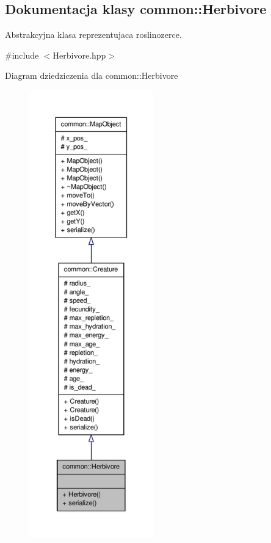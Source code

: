 \hypertarget{classcommon_1_1Herbivore}{\subsection{Dokumentacja klasy common\-:\-:Herbivore}
\label{classcommon_1_1Herbivore}
}


Abstrakcyjna klasa reprezentujaca roslinozerce.  




{\ttfamily \#include $<$Herbivore.\-hpp$>$}



Diagram dziedziczenia dla common\-:\-:Herbivore
\nopagebreak
\begin{figure}[H]
\begin{center}
\leavevmode
\includegraphics[height=550pt]{classcommon_1_1Herbivore__inherit__graph}
\end{center}
\end{figure}


